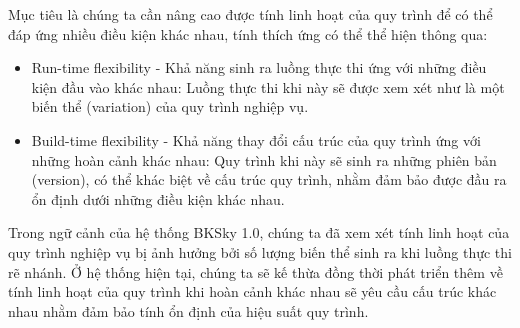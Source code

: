     Mục tiêu là chúng ta cần nâng cao được tính linh hoạt của quy trình để có thể đáp ứng nhiều điều kiện khác nhau, tính thích ứng có thể thể hiện thông qua:

    \begin{itemize}
        \item Run-time flexibility - Khả năng sinh ra luồng thực thi ứng với những điều kiện đầu vào khác nhau: Luồng thực thi khi này sẽ được xem xét như là một biến thể (variation) của quy trình nghiệp vụ.

        \item Build-time flexibility - Khả năng thay đổi cấu trúc của quy trình ứng với những hoàn cảnh khác nhau: Quy trình khi này sẽ sinh ra những phiên bản (version), có thể khác biệt về cấu trúc quy trình, nhằm đảm bảo được đầu ra ổn định dưới những điều kiện khác nhau.
    \end{itemize}

Trong ngữ cảnh của hệ thống BKSky 1.0, chúng ta đã xem xét tính linh hoạt của quy trình nghiệp vụ bị ảnh hưởng bởi số lượng biến thể sinh ra khi luồng thực thi rẽ nhánh. Ở hệ thống hiện tại, chúng ta sẽ kế thừa đồng thời phát triển thêm về tính linh hoạt của quy trình khi hoàn cảnh khác nhau sẽ yêu cầu cấu trúc khác nhau nhằm đảm bảo tính ổn định của hiệu suất quy trình. 
